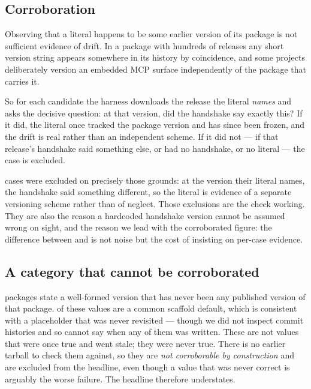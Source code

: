 \documentclass[10pt,journal,compsoc]{IEEEtran}
\begin{document}
\subsection{Corroboration}\label{sec:corrobstep}

Observing that a literal happens to be some earlier version of its package is not sufficient
evidence of drift. In a package with hundreds of releases any short version string appears
somewhere in its history by coincidence, and some projects deliberately version an embedded MCP
surface independently of the package that carries it.

So for each candidate the harness downloads the release the literal \emph{names} and asks the
decisive question: at that version, did the handshake say exactly this? If it did, the literal
once tracked the package version and has since been frozen, and the drift is real rather than
an independent scheme. If it did not --- if that release's handshake said something else, or
had no handshake, or no literal --- the case is excluded.

\factEcoIndependentVersioning{} cases were excluded on precisely those grounds: at the version
their literal names, the handshake said something different, so the literal is evidence of a
separate versioning scheme rather than of neglect. Those exclusions are the check working. They
are also the reason a hardcoded handshake version cannot be assumed wrong on sight, and the
reason we lead with the corroborated figure: the difference between \factEcoDriftRawPct{} and
\factEcoDriftConfirmedPct{} is not noise but the cost of insisting on per-case evidence.

\subsection{A category that cannot be corroborated}

\factEcoNeverPublished{} packages state a well-formed version that has never been any published
version of that package. \factEcoNeverPublishedScaffoldPct{} of these values are a common
scaffold default, which is consistent with a placeholder that was never revisited --- though we
did not inspect commit histories and so cannot say when any of them was written. These are not
values that were once true and went stale; they were never true. There is no
earlier tarball to check them against, so they are \emph{not corroborable by construction} and
are excluded from the headline, even though a value that was never correct is arguably the
worse failure. The headline therefore understates.
\end{document}
